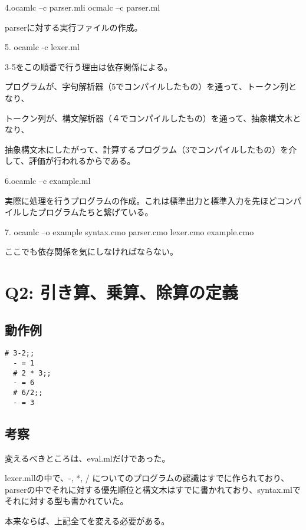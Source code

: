 \documentclass[uplatex,12pt]{jsarticle}
\begin{document}
\vspace{12pt}

4.ocamlc –c parser.mli
ocmalc –c parser.ml

parserに対する実行ファイルの作成。


\vspace{12pt}


5. ocamlc -c lexer.ml

3-5をこの順番で行う理由は依存関係による。

プログラムが、字句解析器（5でコンパイルしたもの）を通って、トークン列となり、

トークン列が、構文解析器（４でコンパイルしたもの）を通って、抽象構文木となり、

抽象構文木にしたがって、計算するプログラム（3でコンパイルしたもの）を介して、評価が行われるからである。

\vspace{12pt}
6.ocamlc –c example.ml

実際に処理を行うプログラムの作成。これは標準出力と標準入力を先ほどコンパイルしたプログラムたちと繋げている。

\vspace{12pt}

7. ocamlc –o example syntax.cmo parser.cmo lexer.cmo example.cmo

ここでも依存関係を気にしなければならない。


\section{Q2: 引き算、乗算、除算の定義}

\subsection{動作例}
\begin{lstlisting}[caption=動作例]
  # 3-2;;
  - = 1
  # 2 * 3;;
  - = 6
  # 6/2;;
  - = 3
\end{lstlisting}

\subsection{考察}
変えるべきところは、eval.mlだけであった。

lexer.mllの中で、-, *, / についてのプログラムの認識はすでに作られており、parserの中でそれに対する優先順位と構文木はすでに書かれており、syntax.mlでそれに対する型も書かれていた。

本来ならば、上記全てを変える必要がある。
\end{document}
